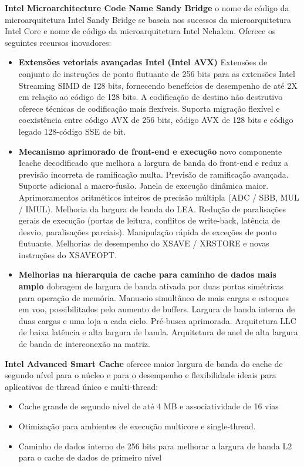 \documentclass[12pt,a4paper,brazilian,utf8]{ppgsi}
\begin{document}
    \textbf{Intel Microarchitecture Code Name Sandy Bridge}
    o nome de código da microarquitetura Intel Sandy Bridge se baseia nos sucessos da microarquitetura Intel Core e nome de código da microarquitetura Intel Nehalem. Oferece os seguintes recursos inovadores:
        \begin{itemize}
        \item \textbf{Extensões vetoriais avançadas Intel (Intel AVX)}
        Extensões de conjunto de instruções de ponto flutuante de 256 bits para as extensões Intel Streaming SIMD de 128 bits, fornecendo benefícios de desempenho de até 2X em relação ao código de 128 bits. A codificação de destino não destrutivo oferece técnicas de codificação mais flexíveis. Suporta migração flexível e coexistência entre código AVX de 256 bits, código AVX de 128 bits e código legado 128-código SSE de bit.
        \item \textbf{Mecanismo aprimorado de front-end e execução}
        novo componente Icache decodificado que melhora a largura de banda do front-end e reduz a previsão incorreta de ramificação multa. Previsão de ramificação avançada. Suporte adicional a macro-fusão. Janela de execução dinâmica maior. Aprimoramentos aritméticos inteiros de precisão múltipla (ADC / SBB, MUL / IMUL). Melhoria da largura de banda do LEA. Redução de paralisações gerais de execução (portas de leitura, conflitos de write-back, latência de desvio, paralisações parciais). Manipulação rápida de exceções de ponto flutuante. Melhorias de desempenho do XSAVE / XRSTORE e novas instruções do XSAVEOPT.
        \item \textbf{Melhorias na hierarquia de cache para caminho de dados mais amplo}
        dobragem de largura de banda ativada por duas portas simétricas para operação de memória. Manuseio simultâneo de mais cargas e estoques em voo, possibilitados pelo aumento de buffers. Largura de banda interna de duas cargas e uma loja a cada ciclo. Pré-busca aprimorada. Arquitetura LLC de baixa latência e alta largura de banda. Arquitetura de anel de alta largura de banda de interconexão na matriz.
    \end{itemize}  

    \textbf{Intel Advanced Smart Cache}
    oferece maior largura de banda do cache de segundo nível para o núcleo e para o desempenho e flexibilidade ideais para aplicativos de thread único e multi-thread:
    \begin{itemize}
        \item Cache grande de segundo nível de  até 4 MB e associatividade de 16 vias
        \item Otimização para ambientes de execução multicore e single-thread.
        \item Caminho de dados interno de 256 bits para melhorar a largura de banda L2 para o cache de dados de primeiro nível
    \end{itemize}
    
\end{document}
